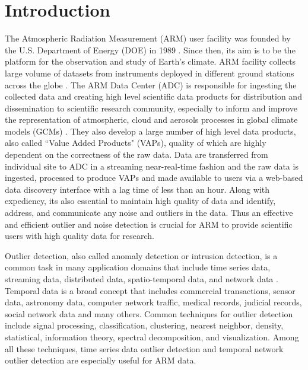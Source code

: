 \section{Introduction}
The Atmospheric Radiation Measurement (ARM) user facility was founded by
the U.S. Department of Energy (DOE) in 1989 \cite{ARM}. Since then, its
aim is to be the platform for the observation and study of Earth's
climate. ARM facility collects large volume of datasets from instruments deployed in
different ground stations across the globe \cite{stokes1994atmospheric}.
The ARM Data Center (ADC) is responsible for ingesting the collected data and
creating high level scientific data products for distribution and
dissemination to scientific research community, especially to inform and
improve the representation of atmospheric, cloud and aerosols
processes in global climate models (GCMs)
\cite{gaustad2014scientific}. They also develop a large number of 
high level data products, also
called ``Value Added Products" (VAPs), quality of which are highly dependent on the
correctness of the raw data. Data are transferred from individual site
to ADC in a streaming near-real-time fashion and the raw data is
ingested, processed to produce VAPs and made available to users via a
web-based data discovery interface with a lag time of less than an hour.
Along with expediency, its also essential to maintain high quality of
data and identify, address, and communicate any noise and outliers in
the data. Thus an effective and efficient outlier and noise detection
is crucial for ARM to provide scientific users with high quality data
for research.

Outlier detection, also called anomaly detection or intrusion detection,
is a common task in many application domains that include time
series data, streaming data, distributed data, spatio-temporal
data, and network data \cite{gupta2014outlier}. Temporal data is
a broad concept that includes commercial transactions, sensor
data, astronomy data, computer network traffic, medical records,
judicial records, social network data and many others. Common
techniques for outlier detection include signal processing,
classification, clustering, nearest neighbor, density,
statistical, information theory, spectral decomposition, and
visualization. Among all these techniques, time series data
outlier detection and temporal network outlier detection are
especially useful for ARM data.


